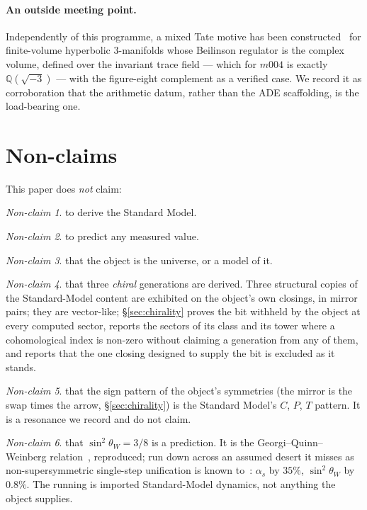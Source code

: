 \documentclass[11pt,a4paper]{article}
\theoremstyle{definition}
\theoremstyle{remark}
\newtheorem{nonclaim}{Non-claim}
\newcommand{\Q}{\mathbb{Q}}
\begin{document}
\paragraph{An outside meeting point.} Independently of this programme, a mixed Tate motive has been constructed~\cite{lee} for finite-volume hyperbolic $3$-manifolds whose Beilinson regulator is the complex
volume, defined over the invariant trace field --- which for $m004$ is exactly $\Q(\sqrt{-3})$ --- with
the figure-eight complement as a verified case. We record it as corroboration that the arithmetic
datum, rather than the ADE scaffolding, is the load-bearing one.

\section*{Non-claims}
This paper does \emph{not} claim:
\begin{nonclaim} to derive the Standard Model. \end{nonclaim}
\begin{nonclaim} to predict any measured value. \end{nonclaim}
\begin{nonclaim} that the object is the universe, or a model of it. \end{nonclaim}
\begin{nonclaim} that three \emph{chiral} generations are derived. Three structural copies of the Standard-Model content
are exhibited on the object's own closings, in mirror pairs; they are vector-like; \S\ref{sec:chirality} proves the bit withheld by the object at every computed sector, reports the sectors of its class and its tower where a cohomological index is non-zero without claiming a generation from any of them, and reports that the one closing designed to supply the bit is excluded as it stands. \end{nonclaim}
\begin{nonclaim} that the sign pattern of the object's symmetries (the mirror is the swap times the arrow,
\S\ref{sec:chirality}) is the Standard Model's $C$, $P$, $T$ pattern. It is a resonance we record and do not claim. \end{nonclaim}
\begin{nonclaim} that $\sin^2\theta_W = 3/8$ is a prediction. It is the Georgi--Quinn--Weinberg relation~\cite{gqw}, reproduced; run down across an assumed desert it misses as
non-supersymmetric single-step unification is known to~\cite{adf,ll}: $\alpha_s$ by $35\%$, $\sin^2\theta_W$ by $0.8\%$. The
running is imported Standard-Model dynamics, not anything the object supplies. \end{nonclaim}
\end{document}
